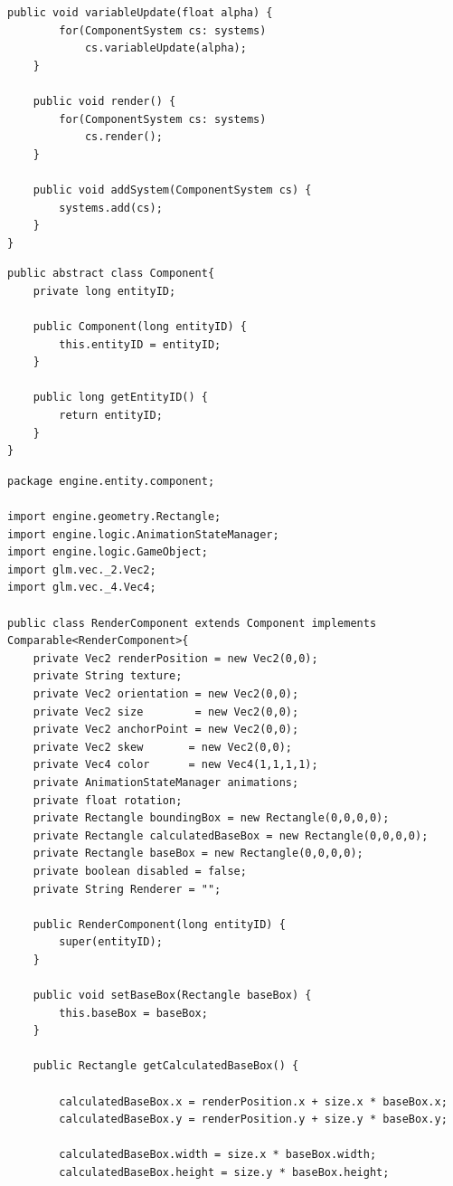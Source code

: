 \documentclass[12pt, 
openright, 
oneside, 
a4paper,    
brazil]{facom-ufu-abntex2}
\begin{document}
\begin{apendicesenv}
\begin{lstlisting}[caption=Classe SystemManager responsável por gerenciar os sistemas de componentes]
	public void variableUpdate(float alpha) {
		for(ComponentSystem cs: systems)
			cs.variableUpdate(alpha);
	}
	
	public void render() {
		for(ComponentSystem cs: systems)
			cs.render();
	}

	public void addSystem(ComponentSystem cs) {
		systems.add(cs);
	}
}

\end{lstlisting}

\begin{lstlisting}[caption=Abstração da classe Component]
public abstract class Component{
	private long entityID;
	
	public Component(long entityID) {
		this.entityID = entityID;
	}
	
	public long getEntityID() {
		return entityID;
	}
}
\end{lstlisting}

\begin{lstlisting}[caption=Exemplo de especialização da classe Component na classe RenderComponent]
package engine.entity.component;

import engine.geometry.Rectangle;
import engine.logic.AnimationStateManager;
import engine.logic.GameObject;
import glm.vec._2.Vec2;
import glm.vec._4.Vec4;

public class RenderComponent extends Component implements Comparable<RenderComponent>{
	private Vec2 renderPosition = new Vec2(0,0);
	private String texture;	
	private Vec2 orientation = new Vec2(0,0);
	private Vec2 size		 = new Vec2(0,0);
	private Vec2 anchorPoint = new Vec2(0,0);
	private Vec2 skew 		= new Vec2(0,0);
	private Vec4 color 		= new Vec4(1,1,1,1);
	private AnimationStateManager animations;
	private float rotation;
	private Rectangle boundingBox = new Rectangle(0,0,0,0);
	private Rectangle calculatedBaseBox = new Rectangle(0,0,0,0);
	private Rectangle baseBox = new Rectangle(0,0,0,0);
	private boolean disabled = false;
	private String Renderer = "";
	
	public RenderComponent(long entityID) {
		super(entityID);
	}
	
	public void setBaseBox(Rectangle baseBox) {
		this.baseBox = baseBox;
	}
	
	public Rectangle getCalculatedBaseBox() {

		calculatedBaseBox.x = renderPosition.x + size.x * baseBox.x;
		calculatedBaseBox.y = renderPosition.y + size.y * baseBox.y;

		calculatedBaseBox.width = size.x * baseBox.width;
		calculatedBaseBox.height = size.y * baseBox.height;
		

\end{lstlisting}
\end{apendicesenv}
\end{document}
